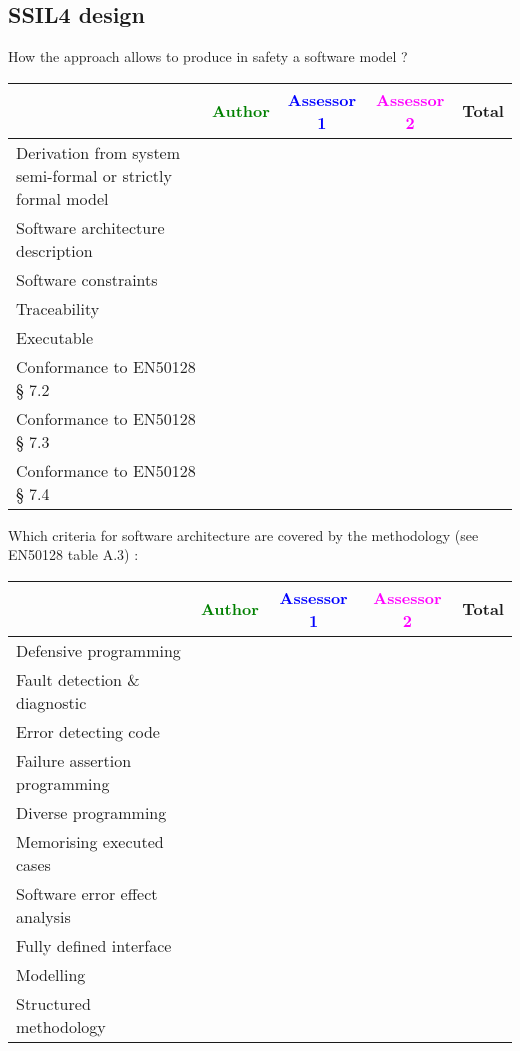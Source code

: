 \subsection{SSIL4 design}

How the approach allows to  produce in safety a software model ?

\begin{tabular}{|l | c | c | c | c|}
\hline
& \textcolor{green}{Author} & \textcolor{blue}{Assessor 1} & \textcolor{magenta}{Assessor 2} & Total \\
\hline
Derivation from system semi-formal or strictly formal model  & & & &  \\
\hline 
Software architecture description  & & & &  \\
\hline
Software constraints  & & & &  \\
\hline
Traceability  & & & &  \\
\hline
Executable  & & & &  \\
\hline
Conformance to EN50128 § 7.2  & & & &  \\
\hline
Conformance to EN50128 § 7.3  & & & &  \\
\hline
Conformance to EN50128 § 7.4  & & & &  \\
\hline
\end{tabular}

Which criteria for software architecture are covered by the methodology
(see EN50128 table A.3) :

\begin{tabular}{|l | c | c | c | c|}
\hline
& \textcolor{green}{Author} & \textcolor{blue}{Assessor 1} & \textcolor{magenta}{Assessor 2} & Total \\
\hline
Defensive programming  & & & &  \\
\hline 
Fault detection \& diagnostic  & & & &  \\
\hline
Error detecting code  & & & &  \\
\hline
Failure assertion programming & & & &  \\
\hline
Diverse programming & & & &  \\
\hline
Memorising executed cases & & & &  \\
\hline
Software error effect analysis & & & &  \\
\hline
Fully defined interface & & & &  \\
\hline
Modelling  & & & &  \\
\hline
Structured methodology & & & &  \\
\hline
\end{tabular}

